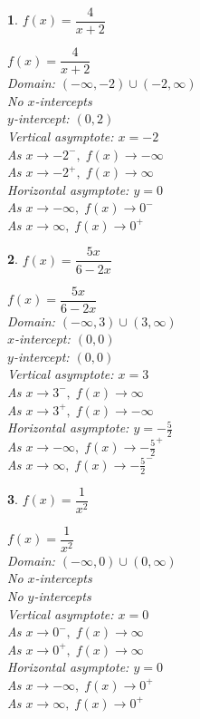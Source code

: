 \documentclass{amsbook}
\newtheorem{exc}{}
\newenvironment{ex}{\begin{exc}\normalfont}{\end{exc}}
\numberwithin{section}{chapter}
\numberwithin{equation}{chapter}
\begin{document}
\begin{multicols}{2}

\begin{ex}
		$f(x) = \dfrac{4}{x + 2}$
	\begin{sol}
		$f(x) = \dfrac{4}{x + 2}$\\
		Domain: $(-\infty, -2) \cup (-2, \infty)$\\
		No $x$-intercepts\\
		$y$-intercept: $(0, 2)$\\
		Vertical asymptote: $x = -2$\\
		As $x \rightarrow -2^{-}, \; f(x) \rightarrow -\infty$\\
		As $x \rightarrow -2^{+}, \; f(x) \rightarrow \infty$\\
		Horizontal asymptote: $y = 0$\\
		As $x \rightarrow -\infty, \; f(x) \rightarrow 0^{-}$\\
		As $x \rightarrow \infty, \; f(x) \rightarrow 0^{+}$
	\end{sol}
\end{ex}


\begin{ex}
		$f(x) = \dfrac{5x}{6 - 2x}$
	\begin{sol}
		$f(x) = \dfrac{5x}{6 - 2x}$\\
		Domain: $(-\infty, 3) \cup (3, \infty)$\\
		$x$-intercept: $(0, 0)$\\
		$y$-intercept: $(0, 0)$\\
		Vertical asymptote: $x = 3$\\
		As $x \rightarrow 3^{-}, \; f(x) \rightarrow \infty$\\
		As $x \rightarrow 3^{+}, \; f(x) \rightarrow -\infty$\\
		Horizontal asymptote: $y = -\frac{5}{2}$\\
		As $x \rightarrow -\infty, \; f(x) \rightarrow -\frac{5}{2}^{+}$\\
		As $x \rightarrow \infty, \; f(x) \rightarrow -\frac{5}{2}^{-}$\
	\end{sol}
\end{ex}

\begin{ex}
		$f(x) = \dfrac{1}{x^{2}}$
	\begin{sol}
		$f(x) = \dfrac{1}{x^{2}}$\\
		Domain: $(-\infty, 0) \cup (0, \infty)$\\
		No $x$-intercepts\\
		No $y$-intercepts\\
		Vertical asymptote: $x = 0$\\
		As $x \rightarrow 0^{-}, \; f(x) \rightarrow \infty$\\
		As $x \rightarrow 0^{+}, \; f(x) \rightarrow \infty$\\
		Horizontal asymptote: $y = 0$\\
		As $x \rightarrow -\infty, \; f(x) \rightarrow 0^{+}$\\
		As $x \rightarrow \infty, \; f(x) \rightarrow 0^{+}$\
	\end{sol}
\end{ex}


\end{multicols}
\end{document}
